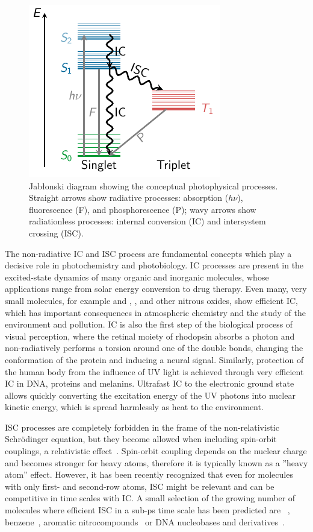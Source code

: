 \documentclass[a4paper,11pt,DIV=15,openany,twoside=false]{scrbook}
\begin{document}
\begin{figure}[h]
  \centering
  \includegraphics[scale=1.6]{img/jablonski/jablonski.pdf}
  \caption{Jab{\l}onski diagram showing the conceptual photophysical processes. Straight arrows show radiative processes: absorption ($h\nu$), fluorescence (F), and phosphorescence (P); wavy arrows show radiationless processes: internal conversion (IC) and intersystem crossing (ISC). }
  \label{fig:jablonski}
\end{figure}

The non-radiative IC and ISC process are fundamental concepts which play a decisive role in photochemistry and photobiology. IC processes are present in the excited-state dynamics of many organic and inorganic molecules, whose applications range from solar energy conversion to drug therapy. Even many, very small molecules, for example  and , ,  and other nitrous oxides, show efficient IC, which has important consequences in atmospheric chemistry and the study of the environment and pollution. IC is also the first step of the biological process of visual perception, where the retinal moiety of rhodopsin absorbs a photon and non-radiatively performs a torsion around one of the double bonds, changing the conformation of the protein and inducing a neural signal. Similarly, protection of the human body from the influence of UV light is achieved through very efficient IC in DNA, proteins and melanins. Ultrafast IC to the electronic ground state allows quickly converting the excitation energy of the UV photons into nuclear kinetic energy, which is spread harmlessly as heat to the environment.

ISC processes are completely forbidden in the frame of the non-relativistic Schr\"odinger equation, but they become allowed when including spin-orbit couplings, a relativistic effect~\cite{Marian2012WCMS}. Spin-orbit coupling depends on the nuclear charge and becomes stronger for heavy atoms, therefore it is typically known as a ''heavy atom'' effect. However, it has been recently recognized that even for molecules with only first- and second-row atoms, ISC might be relevant and can be competitive in time scales with IC. A small selection of the growing number of molecules where efficient ISC in a sub-ps time scale has been predicted are ~\cite{Wilkinson2014JCP,Mai2014JCP_SO2,Leveque2014JCP_ISC}, benzene~\cite{Penfold2012JCP}, aromatic nitrocompounds~\cite{Vogt2013JPC} or DNA nucleobases and derivatives~\cite{Crespo-Hernandez2004CR, Richter2012JPCL, Martinez-Fernandez2012CC, Mai2013C, Reichardt2010CC}.
\end{document}
